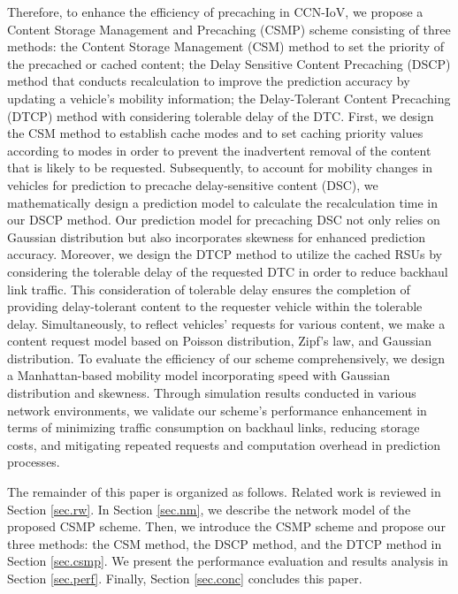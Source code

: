 \documentclass[journal]{IEEEtran}
\begin{document}
Therefore, to enhance the efficiency of precaching in CCN-IoV, we propose a Content Storage Management and Precaching (CSMP) scheme consisting of three methods: the Content Storage Management (CSM) method to set the priority of the precached or cached content; the Delay Sensitive Content Precaching (DSCP) method that conducts recalculation to improve the prediction accuracy by updating a vehicle's mobility information; the Delay-Tolerant Content Precaching (DTCP) method with considering tolerable delay of the DTC.
First, we design the CSM method to establish cache modes and to set caching priority values according to modes in order to prevent the inadvertent removal of the content that is likely to be requested.
Subsequently, to account for mobility changes in vehicles for prediction to precache delay-sensitive content (DSC), we mathematically design a prediction model to calculate the recalculation time in our DSCP method.
Our prediction model for precaching DSC not only relies on Gaussian distribution but also incorporates skewness for enhanced prediction accuracy.
Moreover, we design the DTCP method to utilize the cached RSUs by considering the tolerable delay of the requested DTC in order to reduce backhaul link traffic.
This consideration of tolerable delay ensures the completion of providing delay-tolerant content to the requester vehicle within the tolerable delay.
Simultaneously, to reflect vehicles' requests for various content, we make a content request model based on Poisson distribution, Zipf's law, and Gaussian distribution.
To evaluate the efficiency of our scheme comprehensively, we design a Manhattan-based mobility model incorporating speed with Gaussian distribution and skewness.
Through simulation results conducted in various network environments, we validate our scheme's performance enhancement in terms of minimizing traffic consumption on backhaul links, reducing storage costs, and mitigating repeated requests and computation overhead in prediction processes.

The remainder of this paper is organized as follows.
Related work is reviewed in Section \ref{sec.rw}.
In Section \ref{sec.nm}, we describe the network model of the proposed CSMP scheme.
Then, we introduce the CSMP scheme and propose our three methods: the CSM method, the DSCP method, and the DTCP method in Section \ref{sec.csmp}.
We present the performance evaluation and results analysis in Section \ref{sec.perf}.
Finally, Section \ref{sec.conc} concludes this paper.
\end{document}
